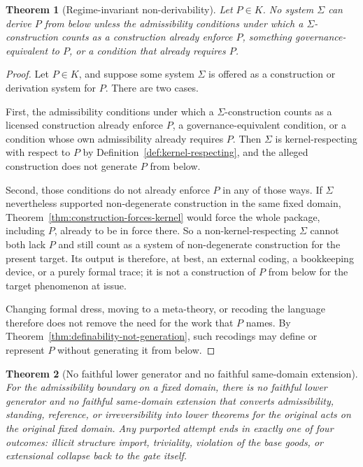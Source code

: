 \documentclass[11pt]{article}
\newtheorem{theorem}{Theorem}[section]
\theoremstyle{definition}
\theoremstyle{remark}
\begin{document}
\begin{theorem}[Regime-invariant non-derivability]\label{thm:regime-invariant}
Let $P \in K$. No system $\Sigma$ can derive $P$ from below unless the admissibility conditions under which a $\Sigma$-construction counts as a construction already enforce $P$, something governance-equivalent to $P$, or a condition that already requires $P$.
\end{theorem}

\begin{proof}
Let $P \in K$, and suppose some system $\Sigma$ is offered as a construction or derivation system for $P$. There are two cases.

First, the admissibility conditions under which a $\Sigma$-construction counts as a licensed construction already enforce $P$, a governance-equivalent condition, or a condition whose own admissibility already requires $P$. Then $\Sigma$ is kernel-respecting with respect to $P$ by Definition~\ref{def:kernel-respecting}, and the alleged construction does not generate $P$ from below.

Second, those conditions do not already enforce $P$ in any of those ways. If $\Sigma$ nevertheless supported non-degenerate construction in the same fixed domain, Theorem~\ref{thm:construction-forces-kernel} would force the whole package, including $P$, already to be in force there. So a non-kernel-respecting $\Sigma$ cannot both lack $P$ and still count as a system of non-degenerate construction for the present target. Its output is therefore, at best, an external coding, a bookkeeping device, or a purely formal trace; it is not a construction of $P$ from below for the target phenomenon at issue.

Changing formal dress, moving to a meta-theory, or recoding the language therefore does not remove the need for the work that $P$ names. By Theorem~\ref{thm:definability-not-generation}, such recodings may define or represent $P$ without generating it from below.
\end{proof}

\begin{theorem}[No faithful lower generator and no faithful same-domain extension]\label{thm:no-faithful-same-domain-extension}
For the admissibility boundary on a fixed domain, there is no faithful lower generator and no faithful same-domain extension that converts admissibility, standing, reference, or irreversibility into lower theorems for the original acts on the original fixed domain. Any purported attempt ends in exactly one of four outcomes: illicit structure import, triviality, violation of the base goods, or extensional collapse back to the gate itself.
\end{theorem}
\end{document}
